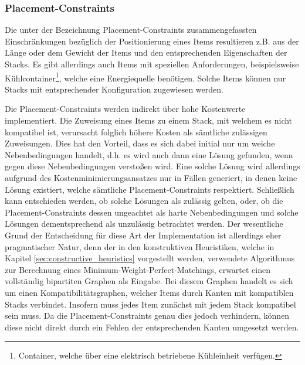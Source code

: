 \pagebreak

\subsubsection{Placement-Constraints}
\label{sec:placement_restrictions}

Die unter der Bezeichnung Placement-Constraints zusammengefassten Einschränkungen bezüglich der Positionierung eines
Items resultieren z.B. aus der Länge oder dem Gewicht der Items und den entsprechenden Eigenschaften der Stacks. Es gibt allerdings auch Items mit speziellen Anforderungen, beispielsweise Kühlcontainer\footnote{Container, welche über eine elektrisch betriebene Kühleinheit verfügen.}, welche eine Energiequelle benötigen. Solche Items können nur Stacks mit entsprechender Konfiguration zugewiesen werden.

Die Placement-Constraints werden indirekt über hohe Kostenwerte implementiert. Die Zuweisung eines Items zu einem
Stack, mit welchem es nicht kompatibel ist, verursacht folglich höhere Kosten als sämtliche zulässigen Zuweisungen.
Dies hat den Vorteil, dass es sich dabei initial nur um weiche Nebenbedingungen handelt,
d.h. es wird auch dann eine Lösung gefunden, wenn gegen diese Nebenbedingungen verstoßen wird.
Eine solche Lösung wird allerdings aufgrund des Kostenminimierungsansatzes nur in Fällen generiert,
in denen keine Lösung existiert, welche sämtliche Placement-Constraints respektiert.
Schließlich kann entschieden werden, ob solche Lösungen als zulässig gelten,
oder, ob die Placement-Constraints dessen ungeachtet als harte Nebenbedingungen und solche
Lösungen dementsprechend als unzulässig betrachtet werden.
Der wesentliche Grund der Entscheidung für diese Art der Implementation ist allerdings eher pragmatischer Natur, denn der in den konstruktiven Heuristiken, welche in Kapitel \ref{sec:constructive_heuristics} vorgestellt werden, verwendete Algorithmus zur Berechnung eines Minimum-Weight-Perfect-Matchings, erwartet einen vollständig bipartiten Graphen als Eingabe. Bei diesem Graphen handelt es sich um einen Kompatibilitätsgraphen, welcher Items durch Kanten mit kompatiblen Stacks verbindet. Insofern muss jedes Item zunächst mit jedem Stack kompatibel sein muss. Da die
Placement-Constraints genau dies jedoch verhindern, können diese nicht direkt durch ein Fehlen der entsprechenden
Kanten umgesetzt werden.

